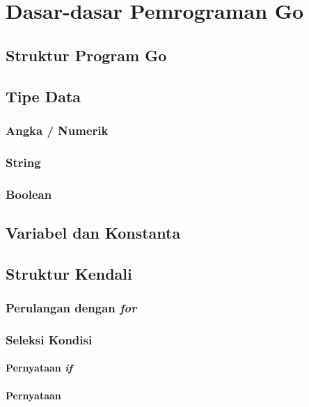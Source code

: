\chapter{Dasar-dasar Pemrograman Go}

\section{Struktur Program Go}


\section{Tipe Data}

\subsection{Angka / Numerik}

\subsection{String}

\subsection{Boolean}


\section{Variabel dan Konstanta}


\section{Struktur Kendali}

\subsection{Perulangan dengan \textit{for}}


\subsection{Seleksi Kondisi}

\subsubsection{Pernyataan \textit{if}}


\subsubsection{Pernyataan }


